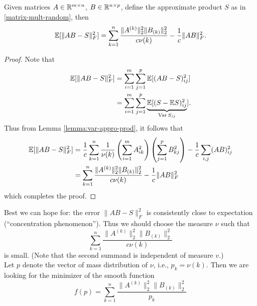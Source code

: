 \begin{lemma} \label{lemma-expected-error-approx-prod}
\begin{mdframed}
Given matrices $A\in\mathbb{R}^{m \times n}$, $B \in \mathbb{R}^{n\times p}$, define the approximate product $S$ as in \eqref{matrix-mult-random}, then
\begin{equation} \label{eq:expected-error}
{
\mathbb{E}[\|AB-S\|_F^2]= \sum_{k=1}^n \frac{\|A^{(k)}\|_2^2 \|B_{(k)}\|_2^2}{c\nu(k)} - \frac{1}{c} \|AB\|_F^2}.
\end{equation}
\end{mdframed}
\begin{proof}
Note that
\begin{equation*}
\begin{split}
\mathbb{E}[\|AB-S\|_F^2] & = \sum_{i=1}^m \sum_{j=1}^p \mathbb{E} [(AB-S)_{ij}^2] \\
& = \sum_{i=1}^m \sum_{j=1}^p \underbrace{\mathbb{E} [(S-\mathbb{E} S)^2_{ij}}_{\operatorname{Var}S_{ij}}].
\end{split}
\end{equation*}
Thus from Lemma \ref{lemma:var-appro-prod}, it follows that
\begin{equation*}
\begin{split}
\mathbb{E}[\|AB-S\|_F^2] & =  \frac{1}{c}\sum_{k=1}^n \frac{1}{\nu(k)} \left( \sum_{i=1}^m A_{ik}^2 \right)
\left( \sum_{j=1}^p B_{kj}^2  \right)- \frac{1}{c} \sum_{i,j}(AB)_{ij}^2 \\
&= \sum_{k=1}^n \frac{\|A^{(k)}\|_2^2 \|B_{(k)}\|_2^2}{c\nu(k)} - \frac{1}{c} \|AB\|_F^2
\end{split}
\end{equation*}
which completes the proof.
\end{proof}
\end{lemma}
Best we can hope for: the error $\|AB-S\|_F^2$ is consistently close to expectation (``concentration phenomenon''). Thus we should choose the measure $\nu$ such that 
\begin{equation*}
 \sum_{k=1}^n \frac{\|A^{(k)}\|_2^2 \|B_{(k)}\|_2^2}{c\nu(k)}
\end{equation*}
is small. (Note that the second summand is independent of measure $v$.) \\
Let $p$ denote the vector of mass distribution of $\nu$, i.e., $p_k=\nu(k)$. Then we are looking for the minimizer of the smooth function
\begin{equation*}
f(p) = \sum_{k=1}^n \frac{\|A^{(k)}\|_2^2 \|B_{(k)}\|_2^2}{p_k}
\end{equation*}
